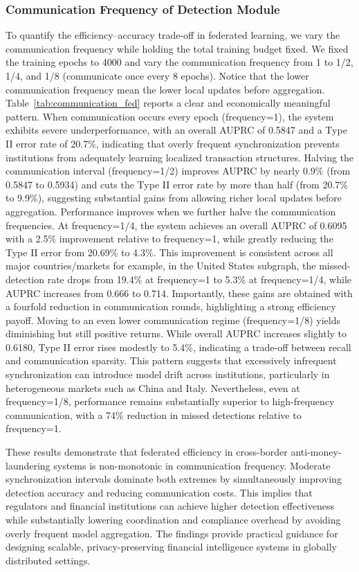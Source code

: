 \documentclass[11pt,english]{article}
\begin{document}
\subsubsection{Communication Frequency of Detection Module}
To quantify the efficiency–accuracy trade-off in federated learning, we vary the communication frequency while holding the total training budget fixed. We fixed the training epochs to 4000 and vary the communication frequency from 1 to 1/2, 1/4, and 1/8 (communicate once every 8 epochs). Notice that the lower communication frequency mean the lower local updates before aggregation. Table~\ref{tab:communication_fed} reports a clear and economically meaningful pattern. When communication occurs every epoch (frequency=1), the system exhibits severe underperformance, with an overall AUPRC of 0.5847 and a Type II error rate of 20.7\%, indicating that overly frequent synchronization prevents institutions from adequately learning localized transaction structures. Halving the communication interval (frequency=1/2) improves AUPRC by nearly 0.9\% (from 0.5847 to 0.5934) and cuts the Type II error rate by more than half (from 20.7\% to 9.9\%), suggesting substantial gains from allowing richer local updates before aggregation. Performance improves when we further halve the communication frequencies. At frequency=1/4, the system achieves an overall AUPRC of 0.6095 with a 2.5\% improvement relative to frequency=1, while greatly reducing the Type II error from 20.69\% to 4.3\%. This improvement is consistent across all major countries/markets for example, in the United States subgraph, the missed-detection rate drops from 19.4\% at frequency=1 to 5.3\% at frequency=1/4, while AUPRC increases from 0.666 to 0.714. Importantly, these gains are obtained with a fourfold reduction in communication rounds, highlighting a strong efficiency payoff. Moving to an even lower communication regime (frequency=1/8) yields diminishing but still positive returns. While overall AUPRC increases slightly to 0.6180, Type II error rises modestly to 5.4\%, indicating a trade-off between recall and communication sparsity. This pattern suggests that excessively infrequent synchronization can introduce model drift across institutions, particularly in heterogeneous markets such as China and Italy. Nevertheless, even at frequency=1/8, performance remains substantially superior to high-frequency communication, with a 74\% reduction in missed detections relative to frequency=1.

These results demonstrate that federated efficiency in cross-border anti-money-laundering systems is non-monotonic in communication frequency. Moderate synchronization intervals dominate both extremes by simultaneously improving detection accuracy and reducing communication costs. This implies that regulators and financial institutions can achieve higher detection effectiveness while substantially lowering coordination and compliance overhead by avoiding overly frequent model aggregation. The findings provide practical guidance for designing scalable, privacy-preserving financial intelligence systems in globally distributed settings.
\end{document}
